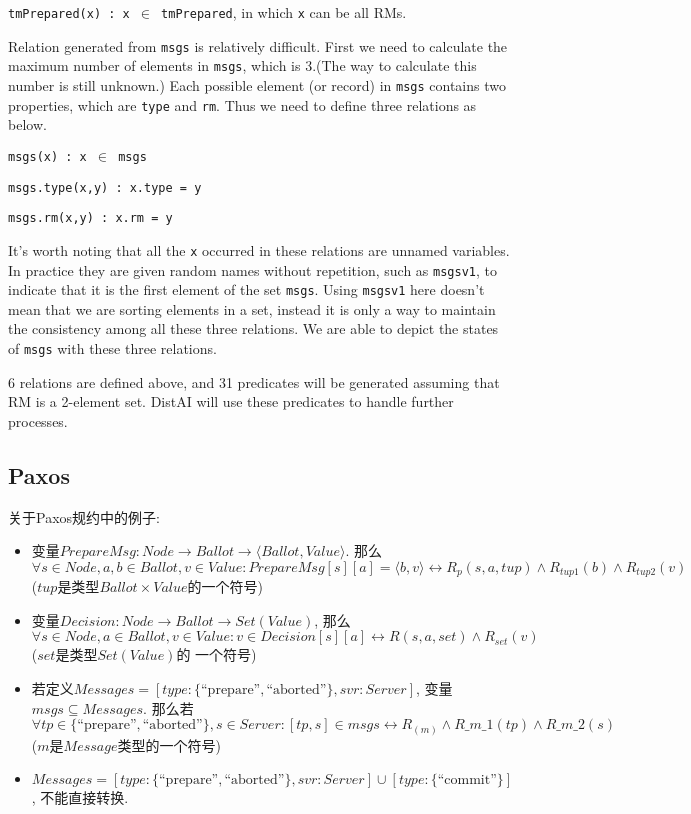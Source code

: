 {\texttt{tmPrepared(x) : x $\in$ tmPrepared}}, in which {\texttt{x}} can be all RMs.

Relation generated from {\texttt{msgs}} is relatively difficult. First we need to calculate the maximum number of elements in {\texttt{msgs}}, which is 3.(The way to calculate this number is still unknown.) Each possible element (or record) in {\texttt{msgs}} contains two properties, which are {\texttt{type}} and {\texttt{rm}}. Thus we need to define three relations as below.

{\texttt{msgs(x) : x $\in$ msgs}}

{\texttt{msgs.type(x,y) : x.type = y}}

{\texttt{msgs.rm(x,y) : x.rm = y}}

It's worth noting that all the {\texttt{x}} occurred in these relations are unnamed variables. In practice they are given random names without repetition, such as {\texttt{msgsv1}}, to indicate that it is the first element of the set {\texttt{msgs}}. Using {\texttt{msgsv1}} here doesn't mean that we are sorting elements in a set, instead it is only a way to maintain the consistency among all these three relations. We are able to depict the states of {\texttt{msgs}} with these three relations.

6 relations are defined above, and 31 predicates will be generated assuming that RM is a 2-element set. DistAI will use these predicates to handle further processes.

\subsection{Paxos} \label{ss:paxos}

关于Paxos规约中的例子:
\begin{itemize}
  \item 变量$PrepareMsg : Node \rightarrow Ballot \rightarrow \langle Ballot,Value\rangle $. 
        那么$ \forall s\in Node, a,b\in Ballot, v\in Value: PrepareMsg[s][a] = \langle b,v\rangle
          \leftrightarrow R_p(s,a,tup) \wedge R_{tup1}(b) \wedge R_{tup2}(v)$ ($tup$是类型$Ballot\times Value$的一个符号)
  \item 变量$Decision : Node \rightarrow Ballot \rightarrow Set(Value)$, 那么$\forall s \in Node, a \in Ballot,
          v \in Value: v \in Decision[s][a] \leftrightarrow R(s,a,set) \wedge R_{set}(v)$ ($set$是类型$Set(Value)$的
          一个符号)
  \item 若定义$Messages = [type : \{\text{``prepare''} ,\text{``aborted''}\}, svr : Server]$, 变量$msgs \subseteq Messages$. 
          那么若$\forall tp \in \{\text{``prepare''},\text{``aborted''} \}, s \in Server : [tp,s] \in msgs \leftrightarrow
           R_(m) \wedge R\_m\_1(tp) \wedge R\_m\_2(s)$ ($m$是$Message$类型的一个符号)
  \item $Messages = [type : \{\text{``prepare''} ,\text{``aborted''}\}, svr : Server] \cup [type : \{\text{``commit''}\}]$, 不能直接转换.
\end{itemize}



